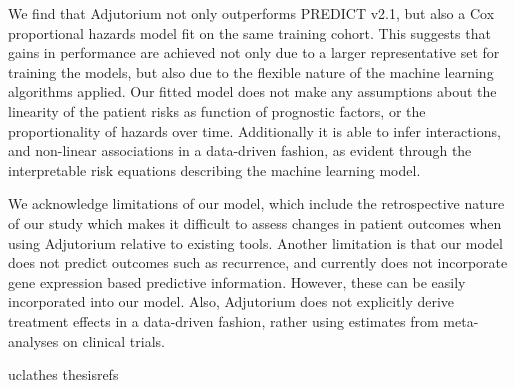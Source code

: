 \documentclass [PhD] {uclathes}
\begin{document}
We find that Adjutorium not only outperforms PREDICT v2.1, but also a Cox proportional hazards model fit on the same training cohort. This suggests that gains in performance are achieved not only due to a larger representative set for training the models, but also due to the flexible nature of the machine learning algorithms applied. Our fitted model does not make any assumptions about the linearity of the patient risks as function of prognostic factors, or the proportionality of hazards over time. Additionally it is able to infer interactions, and non-linear associations in a data-driven fashion, as evident through the interpretable risk equations describing the machine learning model. 

We acknowledge limitations of our model, which include the retrospective nature of our study which makes it difficult to assess changes in patient outcomes when using Adjutorium relative to existing tools. Another limitation is that our model does not predict outcomes such as recurrence, and currently does not incorporate gene expression based predictive information. However, these can be easily incorporated into our model. Also, Adjutorium does not explicitly derive treatment effects in a data-driven fashion, rather using estimates from meta-analyses on clinical trials. 



{
 {uclathes} %
 {thesisrefs}}    %
\end{document}
